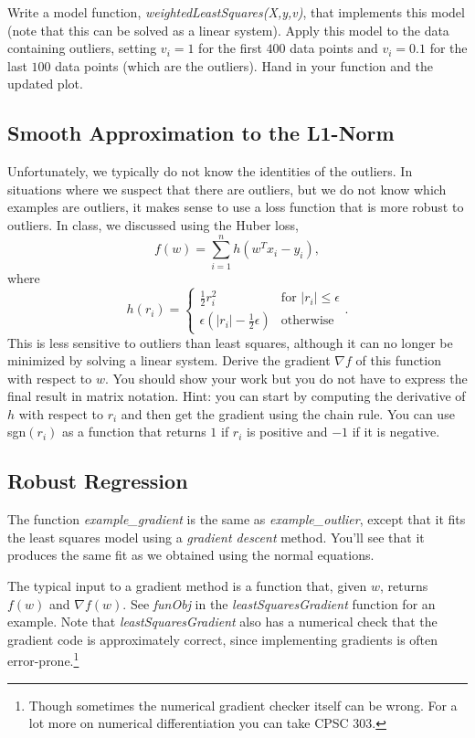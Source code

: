 \documentclass{article}
\def\blu#1{{\color{blu}#1}}
\def\half{\frac 1 2}
\begin{document}
Write a model function, \emph{weightedLeastSquares(X,y,v)}, that implements this model (note that this can be solved as a linear system).
Apply this model to the data containing outliers, setting $v_i = 1$ for the first $400$ data points and $v_i = 0.1$ for the last $100$ data points (which are the outliers). \blu{Hand in your function and the updated plot}.


\pagebreak

\subsection{Smooth Approximation to the L1-Norm}

Unfortunately, we typically do not know the identities of the outliers. In situations where we suspect that there are outliers, but we do not know which examples are outliers, it makes sense to use a loss function that is more robust to outliers. In class, we discussed using the Huber loss,
\[
f(w) = \sum_{i=1}^n h(w^Tx_i  -y_i),
\]
where
\[
h(r_i) =
\begin{cases}
\half r_i^2 & \text{for $|r_i| \leq \epsilon$}\\
\epsilon(|r_i| - \half \epsilon) & \text{otherwise}
\end{cases}.
\]
This is less sensitive to outliers than least squares, although it can no longer be minimized by solving a linear system.
 \blu{Derive
 the gradient $\nabla f$ of this function with respect to $w$. You should show your work but you do not have to express the final result in matrix notation.}
 Hint: you can start by computing the derivative of $h$ with respect to $r_i$ and then get the gradient using the chain rule. You can use sgn$(r_i)$ as a function that returns $1$ if $r_i$ is positive and $-1$ if it is negative.

\pagebreak

\subsection{Robust Regression}

The function \emph{example\_gradient} is the same as \emph{example\_outlier}, except that it fits the least squares model using a \emph{gradient descent} method. You'll see that it produces the same fit as we obtained using the normal equations.

The typical input to a gradient method is a function that, given $w$, returns $f(w)$ and $\nabla f(w)$. See \emph{funObj} in the \emph{leastSquaresGradient} function for an example. Note that \emph{leastSquaresGradient} also has a numerical check that the gradient code is approximately correct, since implementing gradients is often error-prone.\footnote{Though sometimes the numerical gradient checker itself can be wrong. For a lot more on numerical differentiation you can take CPSC 303.}
\end{document}
